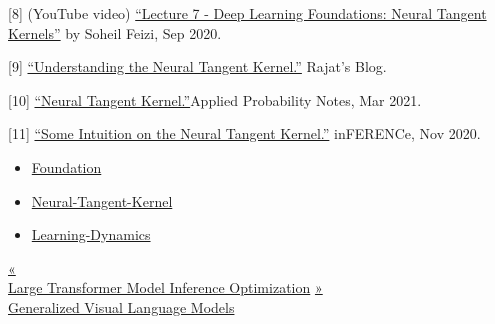 {[}8{]} (YouTube video) \href{https://www.youtube.com/watch?v=DObobAnELkU}{``Lecture 7 - Deep Learning Foundations: Neural Tangent Kernels''} by Soheil Feizi, Sep 2020.

{[}9{]} \href{https://rajatvd.github.io/NTK/}{``Understanding the Neural Tangent Kernel.''} Rajat's Blog.

{[}10{]} \href{https://appliedprobability.blog/2021/03/10/neural-tangent-kernel/}{``Neural Tangent Kernel.''}Applied Probability Notes, Mar 2021.

{[}11{]} \href{https://www.inference.vc/neural-tangent-kernels-some-intuition-for-kernel-gradient-descent/}{``Some Intuition on the Neural Tangent Kernel.''} inFERENCe, Nov 2020.

\begin{itemize}
\tightlist
\item
  \href{https://lilianweng.github.io/tags/foundation/}{Foundation}
\item
  \href{https://lilianweng.github.io/tags/neural-tangent-kernel/}{Neural-Tangent-Kernel}
\item
  \href{https://lilianweng.github.io/tags/learning-dynamics/}{Learning-Dynamics}
\end{itemize}

\href{https://lilianweng.github.io/posts/2023-01-10-inference-optimization/}{{« }\\
{Large Transformer Model Inference Optimization}} \href{https://lilianweng.github.io/posts/2022-06-09-vlm/}{{ »}\\
{Generalized Visual Language Models}}

